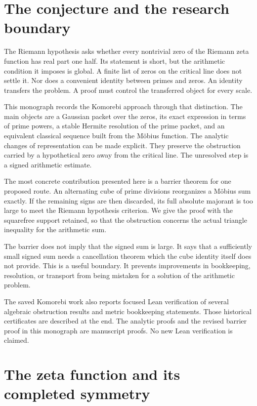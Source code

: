 \section{The conjecture and the research boundary}

The Riemann hypothesis asks whether every nontrivial zero of the Riemann zeta function has real part one half. Its statement is short, but the arithmetic condition it imposes is global. A finite list of zeros on the critical line does not settle it. Nor does a convenient identity between primes and zeros. An identity transfers the problem. A proof must control the transferred object for every scale.

This monograph records the Komorebi approach through that distinction. The main objects are a Gaussian packet over the zeros, its exact expression in terms of prime powers, a stable Hermite resolution of the prime packet, and an equivalent classical sequence built from the Möbius function. The analytic changes of representation can be made explicit. They preserve the obstruction carried by a hypothetical zero away from the critical line. The unresolved step is a signed arithmetic estimate.

The most concrete contribution presented here is a barrier theorem for one proposed route. An alternating cube of prime divisions reorganizes a Möbius sum exactly. If the remaining signs are then discarded, its full absolute majorant is too large to meet the Riemann hypothesis criterion. We give the proof with the squarefree support retained, so that the obstruction concerns the actual triangle inequality for the arithmetic sum.

The barrier does not imply that the signed sum is large. It says that a sufficiently small signed sum needs a cancellation theorem which the cube identity itself does not provide. This is a useful boundary. It prevents improvements in bookkeeping, resolution, or transport from being mistaken for a solution of the arithmetic problem.

The saved Komorebi work also reports focused Lean verification of several algebraic obstruction results and metric bookkeeping statements. Those historical certificates are described at the end. The analytic proofs and the revised barrier proof in this monograph are manuscript proofs. No new Lean verification is claimed.

\section{The zeta function and its completed symmetry}

